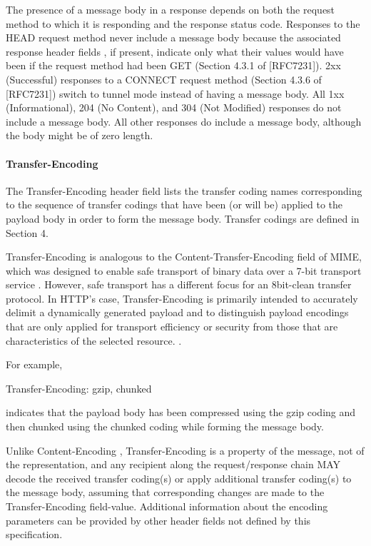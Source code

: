 The presence of a message body in a response depends on both the
request method to which it is responding and the response status code.  
Responses to the HEAD request method 
never include a message body because the associated
response header fields 
, if present, indicate only what their values would have been if
the request method had been GET (Section 4.3.1 of [RFC7231]). 2xx
(Successful) responses to a CONNECT request method (Section 4.3.6 of
[RFC7231]) switch to tunnel mode instead of having a message body.
All 1xx (Informational), 204 (No Content), and 304 (Not Modified)
responses do not include a message body.  All other responses do
include a message body, although the body might be of zero length.

\paragraph{Transfer-Encoding }

The Transfer-Encoding header field lists the transfer coding names
corresponding to the sequence of transfer codings that have been (or
will be) applied to the payload body in order to form the message
body.  Transfer codings are defined in Section 4.



Transfer-Encoding is analogous to the Content-Transfer-Encoding field
of MIME, which was designed to enable safe transport of binary data
over a 7-bit transport service .  However, safe
transport has a different focus for an 8bit-clean transfer protocol.
In HTTP's case, Transfer-Encoding is primarily intended to accurately
delimit a dynamically generated payload and to distinguish payload
encodings that are only applied for transport efficiency or security
from those that are characteristics of the selected resource.
. 

For example,

  Transfer-Encoding: gzip, chunked

indicates that the payload body has been compressed using the gzip
coding and then chunked using the chunked coding while forming the
message body.

Unlike Content-Encoding ,
Transfer-Encoding is a property of the message, not of the
representation, and any recipient along the request/response chain
MAY decode the received transfer coding(s) or apply additional
transfer coding(s) to the message body, assuming that corresponding
changes are made to the Transfer-Encoding field-value.  Additional
information about the encoding parameters can be provided by other
header fields not defined by this specification.



